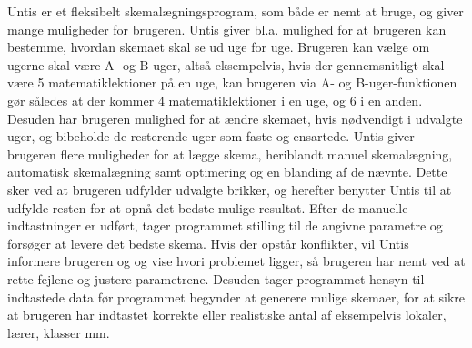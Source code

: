 Untis er et fleksibelt skemalægningsprogram, som både er nemt at bruge, og giver mange muligheder for brugeren. Untis giver bl.a. mulighed for at brugeren kan bestemme, hvordan skemaet skal se ud uge for uge. Brugeren kan vælge om ugerne skal være A- og B-uger, altså eksempelvis, hvis der gennemsnitligt skal være 5 matematiklektioner på en uge, kan brugeren via A- og B-uger-funktionen gør således at der kommer 4 matematiklektioner i en uge, og 6 i en anden. Desuden har brugeren mulighed for at ændre skemaet, hvis nødvendigt i udvalgte uger, og bibeholde de resterende uger som faste og ensartede. 
Untis giver brugeren flere muligheder for at lægge skema, heriblandt manuel skemalægning, automatisk skemalægning samt optimering og en blanding af de nævnte. Dette sker ved at brugeren udfylder udvalgte brikker, og herefter benytter Untis til at udfylde resten for at opnå det bedste mulige resultat. Efter de manuelle indtastninger er udført, tager programmet stilling til de angivne parametre og forsøger at levere det bedste skema. Hvis der opstår konflikter, vil Untis informere brugeren og og vise hvori problemet ligger, så brugeren har nemt ved at rette fejlene og justere parametrene. Desuden tager programmet hensyn til indtastede data før programmet begynder at generere mulige skemaer, for at sikre at brugeren har indtastet korrekte eller realistiske antal af eksempelvis lokaler, lærer, klasser mm.
